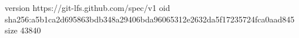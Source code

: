 version https://git-lfs.github.com/spec/v1
oid sha256:a5b1ca2d695863bdb348a29406bda96065312e2632da5f17235724fca0aad845
size 43840
